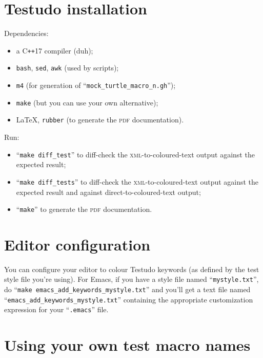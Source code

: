 \documentclass[twoside, a4paper, article]{memoir}
\newcommand*\Cpp{C\texttt{++}}
\begin{document}
\cleartooddpage

\appendices

\chapter{Testudo installation}
\label{cha:testudo-installation}

Dependencies:
\begin{itemize}
\item a \Cpp{}17 compiler (duh);
\item \texttt{bash}, \texttt{sed}, \texttt{awk} (used by scripts);
\item \texttt{m4} (for generation of ``\texttt{mock\_turtle\_macro\_n.gh}'');
\item \texttt{make} (but you can use your own alternative);
\item \LaTeX{}, \texttt{rubber} (to generate the \textsc{pdf} documentation).
\end{itemize}

Run:
\begin{itemize}
\item ``\texttt{make diff\_test}'' to diff-check the
  \textsc{xml}-to-coloured-text output against the expected result;
\item ``\texttt{make diff\_tests}'' to diff-check the
  \textsc{xml}-to-coloured-text output against the expected result and against
  direct-to-coloured-text output;
\item ``\texttt{make}'' to generate the \textsc{pdf} documentation.
\end{itemize}


\chapter{Editor configuration}
\label{cha:editor-configuration}

You can configure your editor to colour Testudo keywords (as defined by the
test style file you're using).  For Emacs, if you have a style file named
``\texttt{mystyle.txt}'', do ``\texttt{make
  emacs\_add\_keywords\_mystyle.txt}'' and you'll get a text file named
``\texttt{emacs\_add\_keywords\_mystyle.txt}'' containing the appropriate
customization expression for your ``\texttt{.emacs}'' file.


\chapter{Using your own test macro names}
\label{cha:using-your-own-test-macro-names}
\end{document}
